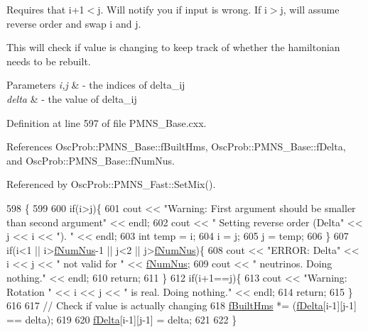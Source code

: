 Requires that i+1$<$j. Will notify you if input is wrong. If i$>$j, will assume reverse order and swap i and j.

This will check if value is changing to keep track of whether the hamiltonian needs to be rebuilt.


\begin{DoxyParams}{Parameters}
{\em i,j} & -\/ the indices of delta\+\_\+ij \\
\hline
{\em delta} & -\/ the value of delta\+\_\+ij \\
\hline
\end{DoxyParams}


Definition at line 597 of file P\+M\+N\+S\+\_\+\+Base.\+cxx.



References Osc\+Prob\+::\+P\+M\+N\+S\+\_\+\+Base\+::f\+Built\+Hms, Osc\+Prob\+::\+P\+M\+N\+S\+\_\+\+Base\+::f\+Delta, and Osc\+Prob\+::\+P\+M\+N\+S\+\_\+\+Base\+::f\+Num\+Nus.



Referenced by Osc\+Prob\+::\+P\+M\+N\+S\+\_\+\+Fast\+::\+Set\+Mix().


\begin{DoxyCode}
598 \{
599 
600   \textcolor{keywordflow}{if}(i>j)\{
601     cout << \textcolor{stringliteral}{"Warning: First argument should be smaller than second argument"} << endl;
602     cout << \textcolor{stringliteral}{"         Setting reverse order (Delta"} << j << i << \textcolor{stringliteral}{"). "} << endl;
603     \textcolor{keywordtype}{int} temp = i;
604     i = j;
605     j = temp;
606   \}
607   \textcolor{keywordflow}{if}(i<1 || i>\hyperlink{classOscProb_1_1PMNS__Base_a24bb74bed63569dfe88b18fa6a08060e}{fNumNus}-1 || j<2 || j>\hyperlink{classOscProb_1_1PMNS__Base_a24bb74bed63569dfe88b18fa6a08060e}{fNumNus})\{
608     cout << \textcolor{stringliteral}{"ERROR: Delta"} << i << j << \textcolor{stringliteral}{" not valid for "} << \hyperlink{classOscProb_1_1PMNS__Base_a24bb74bed63569dfe88b18fa6a08060e}{fNumNus};
609     cout << \textcolor{stringliteral}{" neutrinos. Doing nothing."} << endl;
610     \textcolor{keywordflow}{return};
611   \}
612   \textcolor{keywordflow}{if}(i+1==j)\{
613     cout << \textcolor{stringliteral}{"Warning: Rotation "} << i << j << \textcolor{stringliteral}{" is real. Doing nothing."} << endl;
614     \textcolor{keywordflow}{return};
615   \}
616 
617   \textcolor{comment}{// Check if value is actually changing}
618   \hyperlink{classOscProb_1_1PMNS__Base_a9ac3cadeac8db1b90f3152f476244780}{fBuiltHms} *= (\hyperlink{classOscProb_1_1PMNS__Base_ab2a5fa40e689b221c8a7d2c17213810d}{fDelta}[i-1][j-1] == delta);
619 
620   \hyperlink{classOscProb_1_1PMNS__Base_ab2a5fa40e689b221c8a7d2c17213810d}{fDelta}[i-1][j-1] = delta;
621 
622 \}
\end{DoxyCode}
